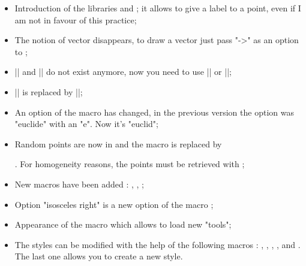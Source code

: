 \begin{itemize}
\item Introduction of the libraries  and ; it allows to give a label to a point, even if I am not in favour of this practice;

\item  The notion of vector disappears, to draw a vector just pass "->" as an option to ;


\item |\tkzDefIntSimilitudeCenter| and |\tkzDefExtSimilitudeCenter|  do not exist anymore, now you need to use  |\tkzDefSimilitudeCenter[int]| or |\tkzDefSimilitudeCenter[ext]|;
  
\item |\tkzDefRandPointOn| is replaced by |\tkzGetRandPointOn|;


\item An option of the macro  has changed, in the previous version the option was "euclide" with an "e". Now it's "euclid";

\item Random points are now in \tkzname{\tkznameofpack} and the macro  is replaced by

 . For homogeneity reasons, the points must be retrieved with ;

\item New macros have been added : , , ;


\item Option "isosceles right" is a new option of the macro ;

\item Appearance of the macro  which allows to load new "tools";

\item The styles can be modified with the help of the following macros : , , , ,  and . The last one allows you to create a new style.
\end{itemize}

\endinput